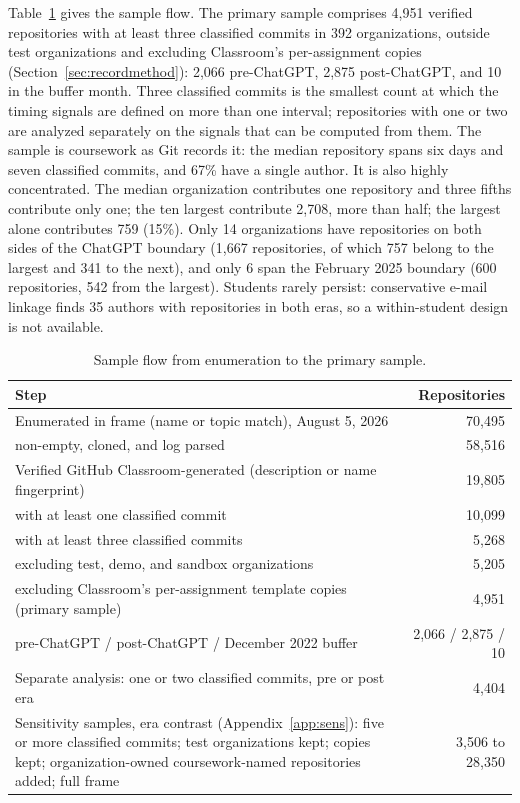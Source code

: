 \documentclass[acmsmall,screen,review,anonymous]{acmart}
\begin{document}
Table~\ref{tab:attrition} gives the sample flow. The primary sample comprises 4,951 verified repositories with at least three classified commits in 392 organizations, outside test organizations and excluding Classroom's per-assignment copies (Section~\ref{sec:recordmethod}): 2,066 pre-ChatGPT, 2,875 post-ChatGPT, and 10 in the buffer month. Three classified commits is the smallest count at which the timing signals are defined on more than one interval; repositories with one or two are analyzed separately on the signals that can be computed from them. The sample is coursework as Git records it: the median repository spans six days and seven classified commits, and 67\% have a single author. It is also highly concentrated. The median organization contributes one repository and three fifths contribute only one; the ten largest contribute 2,708, more than half; the largest alone contributes 759 (15\%). Only 14 organizations have repositories on both sides of the ChatGPT boundary (1,667 repositories, of which 757 belong to the largest and 341 to the next), and only 6 span the February 2025 boundary (600 repositories, 542 from the largest). Students rarely persist: conservative e-mail linkage finds 35 authors with repositories in both eras, so a within-student design is not available.

\begin{table}
\caption{Sample flow from enumeration to the primary sample.}
\label{tab:attrition}
\footnotesize
\begin{tabular}{@{}p{10.2cm}r@{}}
\toprule
Step & Repositories \\
\midrule
Enumerated in frame (name or topic match), August 5, 2026 & 70,495 \\
\quad non-empty, cloned, and log parsed & 58,516 \\
Verified GitHub Classroom-generated (description or name fingerprint) & 19,805 \\
\quad with at least one classified commit & 10,099 \\
\quad with at least three classified commits & 5,268 \\
\quad excluding test, demo, and sandbox organizations & 5,205 \\
\quad excluding Classroom's per-assignment template copies (primary sample) & 4,951 \\
\qquad pre-ChatGPT / post-ChatGPT / December 2022 buffer & 2,066 / 2,875 / 10 \\
Separate analysis: one or two classified commits, pre or post era & 4,404 \\
Sensitivity samples, era contrast (Appendix~\ref{app:sens}): five or more classified commits; test organizations kept; copies kept; organization-owned coursework-named repositories added; full frame & 3,506 to 28,350 \\
\bottomrule
\end{tabular}
\end{table}
\end{document}
